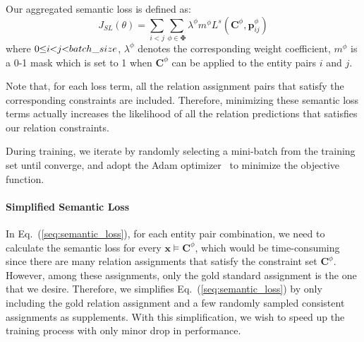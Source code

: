 Our aggregated semantic loss is defined as:
\begin{equation}
	J_{SL}(\theta) = \sum\limits_{i < j}{\sum_{\phi \in \bm{\Phi}}{\lambda ^{\phi}m^{\phi}L^{s}(\bm{C}^{\phi}, \bm{p}_{ij}^{\phi})}}
\end{equation}
where $0\hspace{-0.3em}\leq\hspace{-0.3em}i\hspace{-0.3em}<\hspace{-0.3em}j\hspace{-0.3em}<\hspace{-0.3em}batch\_size$,
$\lambda^{\phi}$ denotes the corresponding weight coefficient, 
$m^{\phi}$ is a 0-1 mask which is set to 1 when $\bm{C}^{\phi}$ can be applied to the entity pairs $i$ and $j$.

Note that, for each loss term, all the relation assignment pairs that satisfy the corresponding constraints are included.
Therefore, minimizing these semantic loss terms actually increases the likelihood of all the relation predictions that satisfies our relation constraints.

During training, we iterate by randomly selecting a mini-batch from the training set until converge, and adopt the Adam optimizer~\cite{kingma2014adam} to minimize the objective function.
\paragraph{Simplified Semantic Loss}
In Eq.~(\ref{seq:semantic_loss}), for each entity pair combination, we need to calculate the semantic loss for every $\bm x \models \bm{C}^{\phi}$, which would be time-consuming since there are many relation assignments that satisfy the constraint set $\bm{C}^{\phi}$.
However, among these assignments, only the gold standard assignment is the one that we desire.
Therefore, we simplifies Eq.~(\ref{seq:semantic_loss}) by only including the gold relation assignment and a few randomly sampled consistent assignments as supplements.
With this simplification, we wish to speed up the training process with only minor drop in performance.


